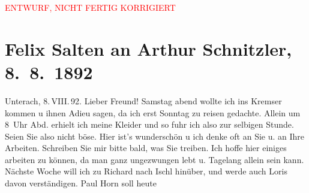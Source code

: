 
\begin{center}
            \textcolor{red}{ENTWURF, NICHT FERTIG KORRIGIERT}
                      \end{center}
            
         
         \renewcommand{\erwaehntePersonen}{Personen: Hermann Bahr, Richard Beer-Hofmann, Hugo von Hofmannsthal, Paul Horn, Gustav Schwarzkopf}
         \renewcommand{\erwaehnteOrte}{Orte: Bad Ischl, Berghof, Café Kremser, Deutschland, Unterach am Attersee, Wien}
         \renewcommand{\erwaehnteWerke}{}
               \section[Felix Salten an Arthur Schnitzler, 8. 8. 1892]{ Felix Salten an Arthur Schnitzler, 8. 8. 1892}\nopagebreak{}\rehead{ }\begin{ledgroupsized}[t]{13cm}\normalsize\beginnumbering \toendnotes[C]{\smallbreak\pagebreak[2]} 
\pstart
           {\pb}Unterach, 8. VIII. 92.
               \pend
           \pstart
           Lieber Freund! Samstag abend wollte ich ins Kremser
               kommen u ihnen Adieu sagen, da ich erst Sonntag zu reisen gedachte.
               Allein um 8 Uhr Abd. erhielt ich meine Kleider und so fuhr ich also zur selbigen
               Stunde. Seien Sie also nicht böse. Hier ist's wunderschön u ich denke oft an Sie u.
               an Ihre Arbeiten. Schreiben Sie mir bitte bald, was Sie treiben.\pend
           \pstart
           {\pb}Ich hoffe hier einiges
               arbeiten zu können, da man ganz ungezwungen lebt u. Tagelang allein sein kann.
               Nächste Woche will ich zu Richard nach Ischl hinüber, und werde auch Loris davon verständigen. Paul{ }{\pb}Horn soll heute

\end{ledgroupsized}
